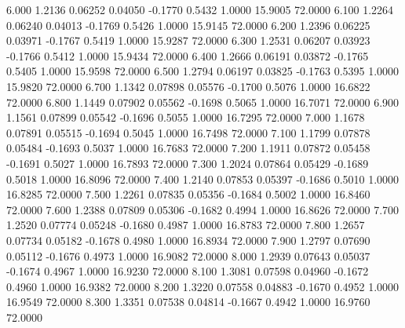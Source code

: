    6.000   1.2136   0.06252   0.04050  -0.1770   0.5432   1.0000  15.9005  72.0000
   6.100   1.2264   0.06240   0.04013  -0.1769   0.5426   1.0000  15.9145  72.0000
   6.200   1.2396   0.06225   0.03971  -0.1767   0.5419   1.0000  15.9287  72.0000
   6.300   1.2531   0.06207   0.03923  -0.1766   0.5412   1.0000  15.9434  72.0000
   6.400   1.2666   0.06191   0.03872  -0.1765   0.5405   1.0000  15.9598  72.0000
   6.500   1.2794   0.06197   0.03825  -0.1763   0.5395   1.0000  15.9820  72.0000
   6.700   1.1342   0.07898   0.05576  -0.1700   0.5076   1.0000  16.6822  72.0000
   6.800   1.1449   0.07902   0.05562  -0.1698   0.5065   1.0000  16.7071  72.0000
   6.900   1.1561   0.07899   0.05542  -0.1696   0.5055   1.0000  16.7295  72.0000
   7.000   1.1678   0.07891   0.05515  -0.1694   0.5045   1.0000  16.7498  72.0000
   7.100   1.1799   0.07878   0.05484  -0.1693   0.5037   1.0000  16.7683  72.0000
   7.200   1.1911   0.07872   0.05458  -0.1691   0.5027   1.0000  16.7893  72.0000
   7.300   1.2024   0.07864   0.05429  -0.1689   0.5018   1.0000  16.8096  72.0000
   7.400   1.2140   0.07853   0.05397  -0.1686   0.5010   1.0000  16.8285  72.0000
   7.500   1.2261   0.07835   0.05356  -0.1684   0.5002   1.0000  16.8460  72.0000
   7.600   1.2388   0.07809   0.05306  -0.1682   0.4994   1.0000  16.8626  72.0000
   7.700   1.2520   0.07774   0.05248  -0.1680   0.4987   1.0000  16.8783  72.0000
   7.800   1.2657   0.07734   0.05182  -0.1678   0.4980   1.0000  16.8934  72.0000
   7.900   1.2797   0.07690   0.05112  -0.1676   0.4973   1.0000  16.9082  72.0000
   8.000   1.2939   0.07643   0.05037  -0.1674   0.4967   1.0000  16.9230  72.0000
   8.100   1.3081   0.07598   0.04960  -0.1672   0.4960   1.0000  16.9382  72.0000
   8.200   1.3220   0.07558   0.04883  -0.1670   0.4952   1.0000  16.9549  72.0000
   8.300   1.3351   0.07538   0.04814  -0.1667   0.4942   1.0000  16.9760  72.0000
